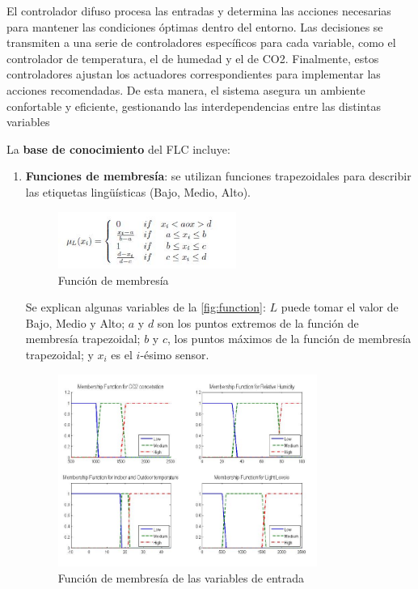 El controlador difuso procesa las entradas y determina las acciones necesarias para mantener las condiciones óptimas dentro del entorno. Las decisiones se transmiten a una serie de controladores específicos para cada variable, como el controlador de temperatura, el de humedad y el de CO2. Finalmente, estos controladores ajustan los actuadores correspondientes para implementar las acciones recomendadas. De esta manera, el sistema asegura un ambiente confortable y eficiente, gestionando las interdependencias entre las distintas variables

\vspace{0.4cm}

La \textbf{base de conocimiento} del FLC incluye:
\begin{enumerate}
	\item \textbf{Funciones de membresía}: se utilizan funciones trapezoidales para describir las etiquetas lingüísticas (Bajo, Medio, Alto).
	\begin{figure}[H]
		\centering
		\includegraphics[width=0.55\textwidth]{imgs/function.JPG}
		\caption{Función de membresía}
		\label{fig:function}
	\end{figure}
	
	Se explican algunas variables de la \autoref{fig:function}: $L$ puede tomar el valor de Bajo, Medio y Alto; $a$ y $d$ son los puntos extremos de la función de membresía trapezoidal; $b$ y $c$, los puntos máximos de la función de membresía trapezoidal; y $x_i$ es el $i$-ésimo sensor.
	
	\begin{figure}[H]
		\centering
		\includegraphics[width=0.8\textwidth]{imgs/membership-functions-input.JPG}
		\caption{Función de membresía de las variables de entrada}
		\label{fig:membership-functions-input}
	\end{figure}
	

\end{enumerate}
